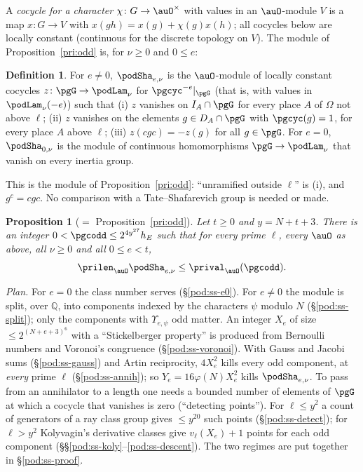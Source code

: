 \documentclass[10pt]{amsart}
\newtheorem{proposition}[theorem]{Proposition}
\theoremstyle{definition}
\newtheorem{definition}[theorem]{Definition}
\theoremstyle{remark}
\newcommand{\Q}{\mathbb Q}
\begin{document}
A \emph{cocycle for a character} $\chi\colon G\to\auO^\times$ with values in an $\auO$-module $V$
is a map $x\colon G\to V$ with $x(gh)=x(g)+\chi(g)x(h)$; all cocycles below are locally constant
(continuous for the discrete topology on $V$). The module of Proposition~\ref{pri:odd} is, for
$\nu\ge0$ and $0\le e$:
\begin{definition}\label{pod:def-sha}
For $e\ne0$, $\podSha_{e,\nu}$ is the $\auO$-module of locally constant cocycles $z\colon\pgG\to
\podLam_\nu$ for $\pgcyc^{-e}|_{\pgG}$ (that is, with values in $\podLam_\nu(-e)$) such that (i) $z$
vanishes on $I_A\cap\pgG$ for every place $A$ of $\Omega$ not above $\ell$; (ii) $z$ vanishes on
the elements $g\in D_A\cap\pgG$ with $\pgcyc(g)=1$, for every place $A$ above $\ell$; (iii) $z(cgc)=
-z(g)$ for all $g\in\pgG$. For $e=0$, $\podSha_{0,\nu}$ is the module of continuous homomorphisms
$\pgG\to\podLam_\nu$ that vanish on every inertia group.
\end{definition}
This is the module of Proposition~\ref{pri:odd}: ``unramified outside $\ell$'' is (i), and $g^c=cgc$.
No comparison with a Tate--Shafarevich group is needed or made.

\begin{proposition}[$=$ Proposition~\ref{pri:odd}]\label{pod:odd}
Let $t\ge0$ and $y=N+t+3$. There is an integer $0<\pgcodd\le2^{4y^{27}}h_E$ such that for every
prime $\ell$, every $\auO$ as above, all $\nu\ge0$ and all $0\le e<t$,
\[
\prilen_\auO\podSha_{e,\nu}\le\prival_\auO(\pgcodd).
\]
\end{proposition}

\emph{Plan.} For $e=0$ the class number serves (\S\ref{pod:ss-e0}). For $e\ne0$ the module is split,
over $\Q$, into components indexed by the characters $\psi$ modulo $N$ (\S\ref{pod:ss-split}); only
the components with $\Upsilon_{e,\psi}$ odd matter. An integer $X_e$ of size $\le2^{(N+e+3)^6}$ with
a ``Stickelberger property'' is produced from Bernoulli numbers and Voronoi's congruence
(\S\ref{pod:ss-voronoi}). With Gauss and Jacobi sums (\S\ref{pod:ss-gauss}) and Artin reciprocity,
$4X_e^2$ kills every odd component, at \emph{every} prime $\ell$ (\S\ref{pod:ss-annih}); so
$Y_e=16\varphi(N)X_e^2$ kills $\podSha_{e,\nu}$. To pass from an annihilator to a length one needs
a bounded number of elements of $\pgG$ at which a cocycle that vanishes is zero (``detecting
points''). For $\ell\le y^2$ a count of generators of a ray class group gives $\le y^{20}$ such points
(\S\ref{pod:ss-detect}); for $\ell>y^2$ Kolyvagin's derivative classes give $v_\ell(X_e)+1$ points for
each odd component (\S\S\ref{pod:ss-koly}--\ref{pod:ss-descent}). The two regimes are put together
in \S\ref{pod:ss-proof}.
\end{document}
